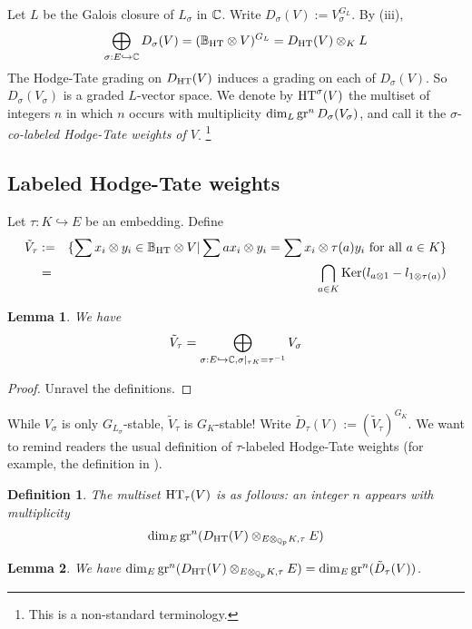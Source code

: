 \documentclass[10pt,a4paper,twoside]{article}
\newtheorem{lem}{Lemma}
\newtheorem{dfn}{Definition}
\begin{document}
\begin{appendix}
Let $L$ be the Galois closure of $L_\sigma$ in ${\mathbb{C}}$.
Write $D_{\sigma}(V) := V_{\sigma}^{G_{L}}$.
By (iii), $$
\bigoplus_{\sigma: E\hookrightarrow {\mathbb{C}}} D_{\sigma}(V)
= (\mathbb{B}_{\operatorname{HT}}\otimes V)^{G_L}
= D_{{\operatorname{HT}}}(V)\otimes_{K}L
$$
The Hodge-Tate grading on $D_{{\operatorname{HT}}}(V)$ induces
a grading on each of $D_{\sigma}(V)$.
So $D_{\sigma}(V_\sigma)$ is a graded $L$-vector space.
We denote by ${\operatorname{HT}}^{\sigma}(V)$
 the multiset of integers $n$
 in which $n$ occurs with multiplicity
 $\dim_L \operatorname{gr}^n D_{\sigma}(V_\sigma)$, and call it
 the $\sigma$-\textit{co-labeled Hodge-Tate weights of $V$}.
\footnote{This is a non-standard terminology.}

\subsection{Labeled Hodge-Tate weights}


Let $\tau: K \hookrightarrow E$ be an embedding.
Define 
\begin{eqnarray}
\tilde V_{\tau} &:=&\{\sum x_i\otimes y_i\in \mathbb{B}_{\operatorname{HT}}\otimes V|
\sum a x_i\otimes y_i 
= \sum x_i \otimes \tau(a) y_i \text{ for all }a\in K\}\nonumber\\
&=&\bigcap_{a\in K}\operatorname{Ker} (l_{a\otimes 1} - l_{1\otimes \tau(a)})\nonumber
\end{eqnarray}



\begin{lem}
We have
$$
\tilde V_{\tau} = \bigoplus_{\sigma:E\hookrightarrow {\mathbb{C}}, \sigma|_{\tau K} = \tau^{-1}} V_{\sigma}
$$
\end{lem}

\begin{proof}
Unravel the definitions.
\end{proof}

While $V_{\sigma}$ is only $G_{L_{\sigma}}$-stable,
$\tilde V_{\tau}$ is $G_K$-stable!
Write $\tilde D_{\tau}(V) := (\tilde V_{\tau})^{G_K}$.
We want to remind readers the usual definition
of $\tau$-labeled Hodge-Tate weights
(for example, the definition in
\cite[1.1]{GK14}).


\begin{dfn}
The multiset ${\operatorname{HT}}_{\tau}(V)$ is as follows:
an integer $n$ appears with multiplicity
$$
\dim_{E}\operatorname{gr}^n(D_{{\operatorname{HT}}}(V)\otimes_{E\otimes_{\mathbb{Q}_p} K, \tau}E)
$$
\end{dfn}

\begin{lem}
We have
$
\dim_{E}\operatorname{gr}^n(D_{{\operatorname{HT}}}(V)\otimes_{E\otimes_{\mathbb{Q}_p} K, \tau}E)
=\dim_E \operatorname{gr}^n(\tilde D_{\tau}(V))
$.
\end{lem}


\end{appendix}
\end{document}
